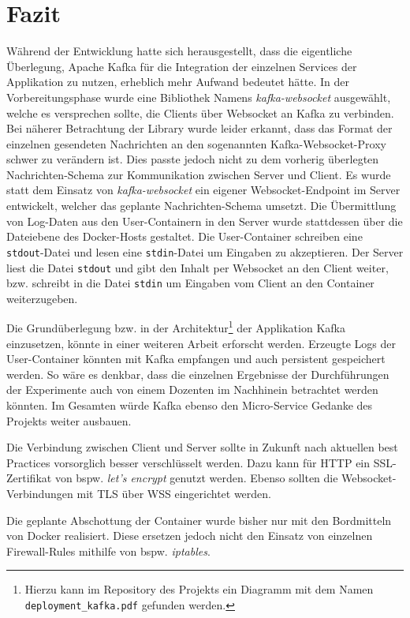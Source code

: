 \chapter{Fazit}
Während der Entwicklung hatte sich herausgestellt, dass die eigentliche Überlegung, Apache Kafka für die Integration der einzelnen Services der Applikation zu nutzen, erheblich mehr Aufwand bedeutet hätte.
In der Vorbereitungsphase wurde eine Bibliothek Namens \textit{kafka-websocket} ausgewählt, welche es versprechen sollte, die Clients über Websocket an Kafka zu verbinden.
Bei näherer Betrachtung der Library wurde leider erkannt, dass das Format der einzelnen gesendeten Nachrichten an den sogenannten Kafka-Websocket-Proxy schwer zu verändern ist.
Dies passte jedoch nicht zu dem vorherig überlegten Nachrichten-Schema zur Kommunikation zwischen Server und Client.
Es wurde statt dem Einsatz von \textit{kafka-websocket} ein eigener Websocket-Endpoint im Server entwickelt, welcher das geplante Nachrichten-Schema umsetzt.
Die Übermittlung von Log-Daten aus den User-Containern in den Server wurde stattdessen über die Dateiebene des Docker-Hosts gestaltet.
Die User-Container schreiben eine \texttt{stdout}-Datei und lesen eine \texttt{stdin}-Datei um Eingaben zu akzeptieren.
Der Server liest die Datei \texttt{stdout} und gibt den Inhalt per Websocket an den Client weiter, bzw. schreibt in die Datei \texttt{stdin} um Eingaben vom Client an den Container weiterzugeben.
\par
Die Grundüberlegung bzw. in der Architektur\footnote{Hierzu kann im Repository des Projekts ein Diagramm mit dem Namen \texttt{deployment\_kafka.pdf} gefunden werden.} der Applikation Kafka einzusetzen, könnte in einer weiteren Arbeit erforscht werden.
Erzeugte Logs der User-Container könnten mit Kafka empfangen und auch persistent gespeichert werden.
So wäre es denkbar, dass die einzelnen Ergebnisse der Durchführungen der Experimente auch von einem Dozenten im Nachhinein betrachtet werden könnten.
Im Gesamten würde Kafka ebenso den Micro-Service Gedanke des Projekts weiter ausbauen.
\par
Die Verbindung zwischen Client und Server sollte in Zukunft nach aktuellen best Practices vorsorglich besser verschlüsselt werden.
Dazu kann für HTTP ein SSL-Zertifikat von \ac{bspw.} \textit{let's encrypt} genutzt werden.
Ebenso sollten die Websocket-Verbindungen mit TLS über WSS eingerichtet werden.
\par
Die geplante Abschottung der Container wurde bisher nur mit den Bordmitteln von Docker realisiert.
Diese ersetzen jedoch nicht den Einsatz von einzelnen Firewall-Rules mithilfe von \ac{bspw.} \textit{iptables}.
